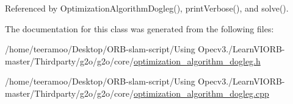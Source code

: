 Referenced by Optimization\+Algorithm\+Dogleg(), print\+Verbose(), and solve().



The documentation for this class was generated from the following files\+:\begin{DoxyCompactItemize}
\item 
/home/teeramoo/\+Desktop/\+O\+R\+B-\/slam-\/script/\+Using Opecv3./\+Learn\+V\+I\+O\+R\+B-\/master/\+Thirdparty/g2o/g2o/core/\hyperlink{optimization__algorithm__dogleg_8h}{optimization\+\_\+algorithm\+\_\+dogleg.\+h}\item 
/home/teeramoo/\+Desktop/\+O\+R\+B-\/slam-\/script/\+Using Opecv3./\+Learn\+V\+I\+O\+R\+B-\/master/\+Thirdparty/g2o/g2o/core/\hyperlink{optimization__algorithm__dogleg_8cpp}{optimization\+\_\+algorithm\+\_\+dogleg.\+cpp}\end{DoxyCompactItemize}
